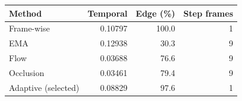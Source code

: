 \begin{tabular}{lrrr}
\toprule Method & Temporal & Edge (\%) & Step frames\\
\midrule
Frame-wise & 0.10797 & 100.0 & 1 \\
EMA & 0.12938 & 30.3 & 9 \\
Flow & 0.03688 & 76.6 & 9 \\
Occlusion & 0.03461 & 79.4 & 9 \\
Adaptive (selected) & 0.08829 & 97.6 & 1 \\
\bottomrule
\end{tabular}
